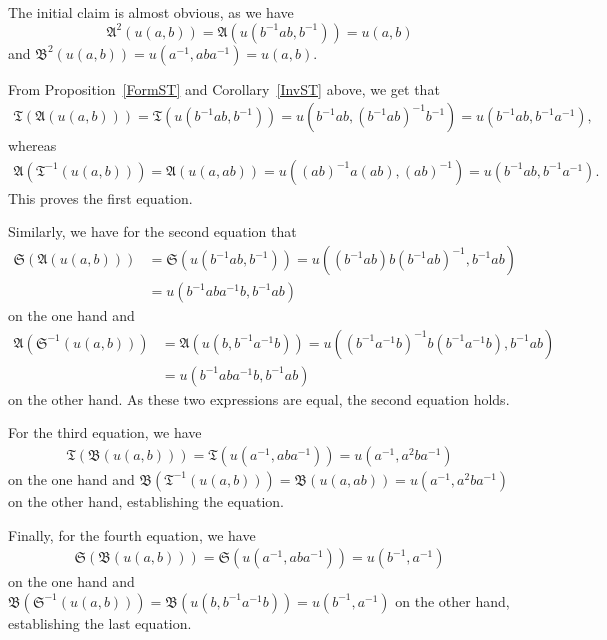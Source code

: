 \documentclass[12pt]{article}
\makeatletter
\theoremstyle{definition}
\theoremstyle{break}
\renewenvironment{proof}[1][\proofname]{\par
\vspace{-5pt}%
\pushQED{\qed}%
\normalfont
\topsep0pt \partopsep0pt %
\trivlist
\item[\hskip\labelsep
\bfseries
#1\@addpunct{.}]\ignorespaces
}{%
\popQED\endtrivlist\@endpefalse
\addvspace{6pt plus 6pt} %
}
\newcommand{\fA}{\mathfrak{A}}
\newcommand{\fB}{\mathfrak{B}}
\newcommand{\fS}{\mathfrak{S}}
\newcommand{\fT}{\mathfrak{T}}
\renewcommand{\1}{\mathbbm{1}}
\newcommand{\uu}{u}
\makeatother
\begin{document}
\begin{proof}
\begin{parlist}
\item
The initial claim is almost obvious, as we have
\[\fA^2(\uu(a,b)) = \fA(\uu(b^{-1} a b, b^{-1})) = \uu(a,b)\]
and
$\fB^2(\uu(a,b)) = \uu(a^{-1}, a b a^{-1}) = \uu(a,b)$.

\item
From Proposition~\ref{FormST} and Corollary~\ref{InvST} above, we get that
\begin{align*}
\fT(\fA(\uu(a,b))) = \fT(\uu(b^{-1} a b, b^{-1})) =
\uu(b^{-1} a b, (b^{-1} a b)^{-1} b^{-1}) =
\uu(b^{-1} a b, b^{-1} a^{-1}),
\end{align*}
whereas
\begin{align*}
\fA(\fT^{-1}(\uu(a,b))) = \fA(\uu(a,ab))
= \uu((ab)^{-1} a (ab), (ab)^{-1})
= \uu(b^{-1} a b, b^{-1} a^{-1}).
\end{align*}
This proves the first equation.

\item
Similarly, we have for the second equation that
\begin{align*}
\fS(\fA(\uu(a,b))) &= \fS(\uu(b^{-1} a b, b^{-1}))
= \uu((b^{-1} a b) b (b^{-1} a b)^{-1}, b^{-1} a b)\\
&= \uu(b^{-1} a b a^{-1} b,b^{-1} a b)
\end{align*}
on the one hand and
\begin{align*}
\fA(\fS^{-1}(\uu(a,b))) &= \fA(\uu(b, b^{-1} a^{-1} b)) =
\uu((b^{-1} a^{-1} b)^{-1} b (b^{-1} a^{-1} b), b^{-1} a b) \\
&= \uu(b^{-1} a b a^{-1} b, b^{-1} a b)
\end{align*}
on the other hand. As these two expressions are equal, the second equation holds.

\item
For the third equation, we have
\begin{align*}
\fT(\fB(\uu(a,b))) = \fT(\uu(a^{-1}, a b a^{-1})) =
\uu(a^{-1}, a^2 b a^{-1})
\end{align*}
on the one hand and
$\fB(\fT^{-1}(\uu(a,b))) = \fB(\uu(a,ab)) = \uu(a^{-1}, a^2 b a^{-1})$
on the other hand, establishing the equation.

\item
Finally, for the fourth equation, we have
\begin{align*}
\fS(\fB(\uu(a,b))) = \fS(\uu(a^{-1}, a b a^{-1})) = \uu(b^{-1},a^{-1})
\end{align*}
on the one hand and
$\fB(\fS^{-1}(\uu(a,b))) = \fB(\uu(b,b^{-1} a^{-1} b)) = \uu(b^{-1},a^{-1})$
on the other hand, establishing the last equation.


\end{parlist}
\end{proof}
\end{document}
